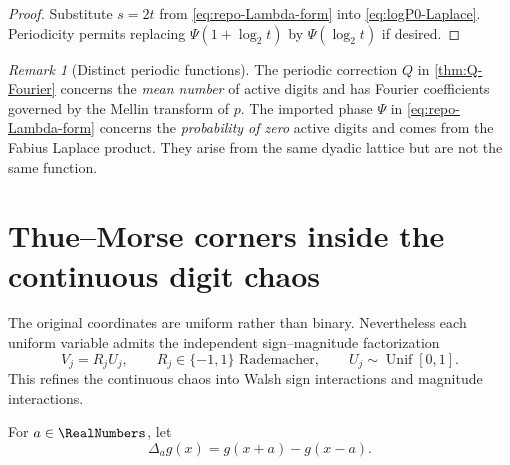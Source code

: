 \documentclass[11pt,oneside]{article}
\theoremstyle{definition}
\theoremstyle{remark}
\newtheorem{remark}[theorem]{Remark}
\begin{document}
\begin{proof}
Substitute $s=2t$ from \eqref{eq:repo-Lambda-form} into
\eqref{eq:logP0-Laplace}.  Periodicity permits replacing
$\Psi(1+\log_2t)$ by $\Psi(\log_2t)$ if desired.
\end{proof}

\begin{remark}[Distinct periodic functions]
The periodic correction $Q$ in \cref{thm:Q-Fourier} concerns the \emph{mean
number} of active digits and has Fourier coefficients governed by the Mellin
transform of $p$.  The imported phase $\Psi$ in
\eqref{eq:repo-Lambda-form} concerns the \emph{probability of zero} active
digits and comes from the Fabius Laplace product.  They arise from the same
dyadic lattice but are not the same function.
\end{remark}

\section{Thue--Morse corners inside the continuous digit chaos}
\label{sec:Thue-Morse}

The original coordinates are uniform rather than binary.  Nevertheless each
uniform variable admits the independent sign--magnitude factorization
\begin{equation}
 V_j=R_jU_j,
 \qquad R_j\in\{-1,1\}\text{ Rademacher},
 \qquad U_j\sim\operatorname{Unif}[0,1].
 \label{eq:sign-magnitude}
\end{equation}
This refines the continuous chaos into Walsh sign interactions and magnitude
interactions.

For $a\in\RealNumbers$, let
\begin{equation}
 \Delta_a g(x)=g(x+a)-g(x-a).
 \label{eq:symmetric-difference}
\end{equation}
\end{document}
